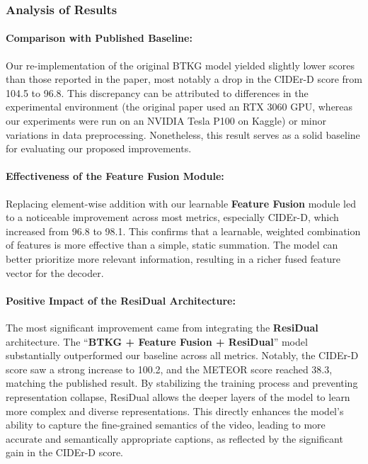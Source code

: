 \subsubsection{Analysis of Results}

\paragraph{Comparison with Published Baseline:} Our re-implementation of the original BTKG model yielded slightly lower scores than those reported in the paper, most notably a drop in the CIDEr-D score from 104.5 to 96.8. This discrepancy can be attributed to differences in the experimental environment (the original paper used an RTX 3060 GPU, whereas our experiments were run on an NVIDIA Tesla P100 on Kaggle) or minor variations in data preprocessing. Nonetheless, this result serves as a solid baseline for evaluating our proposed improvements.

\paragraph{Effectiveness of the Feature Fusion Module:} Replacing element-wise addition with our learnable \textbf{Feature Fusion} module led to a noticeable improvement across most metrics, especially CIDEr-D, which increased from 96.8 to 98.1. This confirms that a learnable, weighted combination of features is more effective than a simple, static summation. The model can better prioritize more relevant information, resulting in a richer fused feature vector for the decoder.

\paragraph{Positive Impact of the ResiDual Architecture:} The most significant improvement came from integrating the \textbf{ResiDual} architecture. The ``\textbf{BTKG + Feature Fusion + ResiDual}'' model substantially outperformed our baseline across all metrics. Notably, the CIDEr-D score saw a strong increase to 100.2, and the METEOR score reached 38.3, matching the published result. By stabilizing the training process and preventing representation collapse, ResiDual allows the deeper layers of the model to learn more complex and diverse representations. This directly enhances the model's ability to capture the fine-grained semantics of the video, leading to more accurate and semantically appropriate captions, as reflected by the significant gain in the CIDEr-D score.

